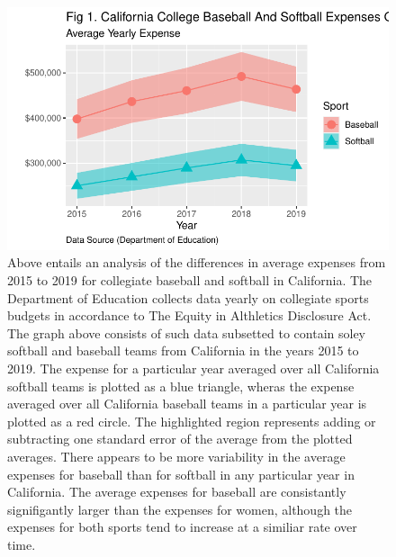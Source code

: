 \documentclass[
  letterpaper,
  DIV=11,
  numbers=noendperiod]{scrartcl}
\begin{document}
\begin{figure}[H]

{\centering \includegraphics{Report_files/figure-pdf/unnamed-chunk-3-1.pdf}

}

\caption{Above entails an analysis of the differences in average
expenses from 2015 to 2019 for collegiate baseball and softball in
California. The Department of Education collects data yearly on
collegiate sports budgets in accordance to The Equity in Althletics
Disclosure Act. The graph above consists of such data subsetted to
contain soley softball and baseball teams from California in the years
2015 to 2019. The expense for a particular year averaged over all
California softball teams is plotted as a blue triangle, wheras the
expense averaged over all California baseball teams in a particular year
is plotted as a red circle. The highlighted region represents adding or
subtracting one standard error of the average from the plotted averages.
There appears to be more variability in the average expenses for
baseball than for softball in any particular year in California. The
average expenses for baseball are consistantly signifigantly larger than
the expenses for women, although the expenses for both sports tend to
increase at a similiar rate over time.}

\end{figure}%
\end{document}
